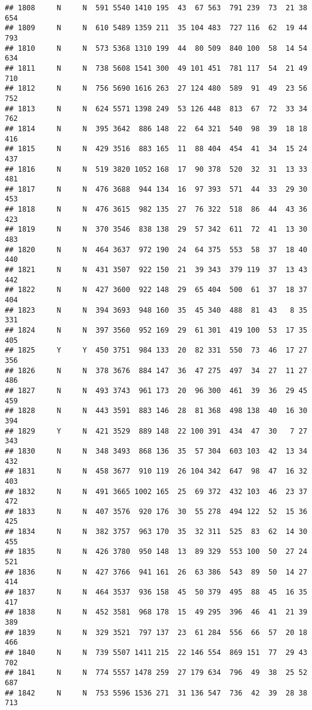 \documentclass[]{article}
\begin{document}
\begin{verbatim}
## 1808     N     N  591 5540 1410 195  43  67 563  791 239  73  21 38  654
## 1809     N     N  610 5489 1359 211  35 104 483  727 116  62  19 44  793
## 1810     N     N  573 5368 1310 199  44  80 509  840 100  58  14 54  634
## 1811     N     N  738 5608 1541 300  49 101 451  781 117  54  21 49  710
## 1812     N     N  756 5690 1616 263  27 124 480  589  91  49  23 56  752
## 1813     N     N  624 5571 1398 249  53 126 448  813  67  72  33 34  762
## 1814     N     N  395 3642  886 148  22  64 321  540  98  39  18 18  416
## 1815     N     N  429 3516  883 165  11  88 404  454  41  34  15 24  437
## 1816     N     N  519 3820 1052 168  17  90 378  520  32  31  13 33  481
## 1817     N     N  476 3688  944 134  16  97 393  571  44  33  29 30  453
## 1818     N     N  476 3615  982 135  27  76 322  518  86  44  43 36  423
## 1819     N     N  370 3546  838 138  29  57 342  611  72  41  13 30  483
## 1820     N     N  464 3637  972 190  24  64 375  553  58  37  18 40  440
## 1821     N     N  431 3507  922 150  21  39 343  379 119  37  13 43  442
## 1822     N     N  427 3600  922 148  29  65 404  500  61  37  18 37  404
## 1823     N     N  394 3693  948 160  35  45 340  488  81  43   8 35  331
## 1824     N     N  397 3560  952 169  29  61 301  419 100  53  17 35  405
## 1825     Y     Y  450 3751  984 133  20  82 331  550  73  46  17 27  356
## 1826     N     N  378 3676  884 147  36  47 275  497  34  27  11 27  486
## 1827     N     N  493 3743  961 173  20  96 300  461  39  36  29 45  459
## 1828     N     N  443 3591  883 146  28  81 368  498 138  40  16 30  394
## 1829     Y     N  421 3529  889 148  22 100 391  434  47  30   7 27  343
## 1830     N     N  348 3493  868 136  35  57 304  603 103  42  13 34  432
## 1831     N     N  458 3677  910 119  26 104 342  647  98  47  16 32  403
## 1832     N     N  491 3665 1002 165  25  69 372  432 103  46  23 37  472
## 1833     N     N  407 3576  920 176  30  55 278  494 122  52  15 36  425
## 1834     N     N  382 3757  963 170  35  32 311  525  83  62  14 30  455
## 1835     N     N  426 3780  950 148  13  89 329  553 100  50  27 24  521
## 1836     N     N  427 3766  941 161  26  63 386  543  89  50  14 27  414
## 1837     N     N  464 3537  936 158  45  50 379  495  88  45  16 35  417
## 1838     N     N  452 3581  968 178  15  49 295  396  46  41  21 39  389
## 1839     N     N  329 3521  797 137  23  61 284  556  66  57  20 18  466
## 1840     N     N  739 5507 1411 215  22 146 554  869 151  77  29 43  702
## 1841     N     N  774 5557 1478 259  27 179 634  796  49  38  25 52  687
## 1842     N     N  753 5596 1536 271  31 136 547  736  42  39  28 38  713

\end{verbatim}
\end{document}
